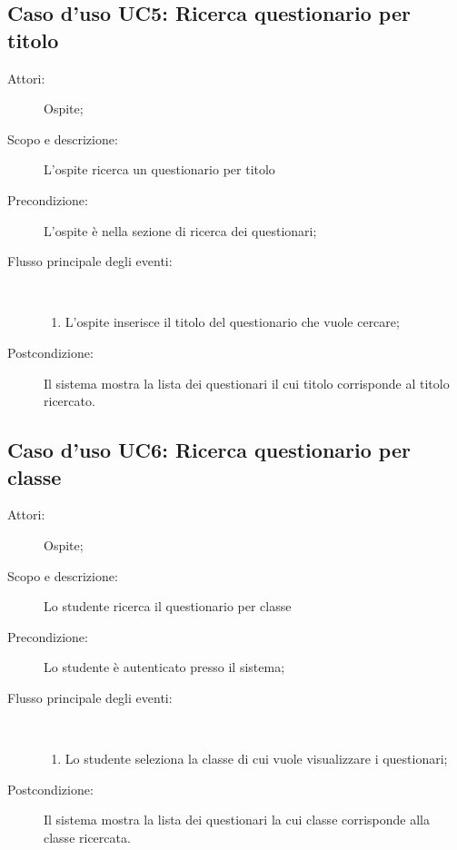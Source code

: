 \subsection{Caso d'uso UC5: Ricerca questionario per titolo}\begin{description}
	\item[Attori:] Ospite;
	\item[Scopo e descrizione:] L'ospite ricerca un questionario per titolo
	\item[Precondizione:] L'ospite è nella sezione di ricerca dei questionari;
	
	\item[Flusso principale degli eventi:] \ 
	\begin{enumerate}
		\item L'ospite inserisce il titolo del questionario che vuole cercare;
		
	\end{enumerate}
	\item[Postcondizione:] Il sistema mostra la lista dei questionari il cui titolo corrisponde al titolo ricercato.
\end{description}
\hypertarget{UC6}{}
\subsection{Caso d'uso UC6: Ricerca questionario per classe}\begin{description}
	\item[Attori:] Ospite;
	\item[Scopo e descrizione:] Lo studente ricerca il questionario per classe
	\item[Precondizione:] Lo studente è autenticato presso il sistema;
	
	\item[Flusso principale degli eventi:] \ 
	\begin{enumerate}
		\item Lo studente seleziona la classe di cui vuole visualizzare i questionari;
		
	\end{enumerate}
	\item[Postcondizione:] Il sistema mostra la lista dei questionari la cui classe corrisponde alla classe ricercata.
\end{description}
\hypertarget{UC7}{}
